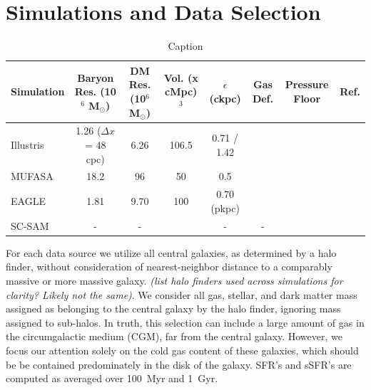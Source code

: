 \documentclass[fleqn,usenatbib]{mnras}
\begin{document}

\section{Simulations and Data Selection}
\begin{table}
\centering
\caption{Caption}
\label{table:simulations}
  \begin{tabular}{l c c c c c c c}
  \hline
  Simulation & Baryon Res. (10$^6$ M$_{\odot}$) & DM Res. (10$^6$ M$_{\odot}$) & Vol. (x cMpc)$^3$ & $\epsilon$ (ckpc) & Gas Def. & Pressure Floor & Ref. \\
  \hline 
  Illustris  & 1.26 ($\Delta x$ = 48 cpc) & 6.26 & 106.5 & 0.71 / 1.42 & &  & \citep{Vogelsberger2014} \\
  MUFASA & 18.2 & 96 & 50 & 0.5 & & & \citep{Dave2016} \\
  EAGLE  & 1.81 &  9.70  & 100 & 0.70 (pkpc) & &  & \citep{Schaye2015,Crain2015} \\
  SC-SAM & -  & - & & - & - & & \citep{Somerville2012,Porter2014}\\
  \hline
  \end{tabular}
  
\end{table}

For each data source we utilize all central galaxies, as determined by a halo finder, without consideration of nearest-neighbor distance to a comparably massive or more massive galaxy. {\it (list halo finders used across simulations for clarity? Likely not the same)}. We consider all gas, stellar, and dark matter mass assigned as belonging to the central galaxy by the halo finder, ignoring mass assigned to sub-halos. In truth, this selection can include a large amount of gas in the circumgalactic medium (CGM), far from the central galaxy. However, we focus our attention solely on the cold gas content of these galaxies, which should be be contained predominately in the disk of the galaxy. SFR's and sSFR's are computed as averaged over 100~Myr and 1~Gyr.
\end{document}
